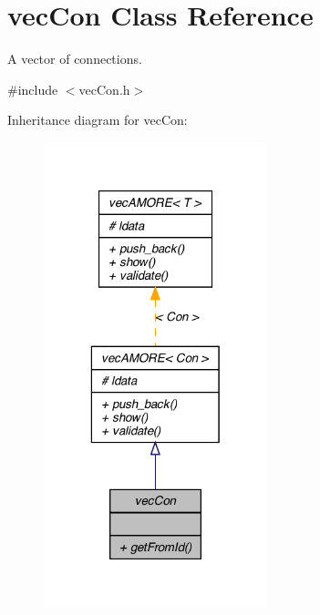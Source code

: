 \hypertarget{classvec_con}{
\section{vecCon Class Reference}
\label{classvec_con}
}


A vector of connections.  




{\ttfamily \#include $<$vecCon.h$>$}



Inheritance diagram for vecCon:\nopagebreak
\begin{figure}[H]
\begin{center}
\leavevmode
\includegraphics[width=184pt]{classvec_con__inherit__graph}
\end{center}
\end{figure}



